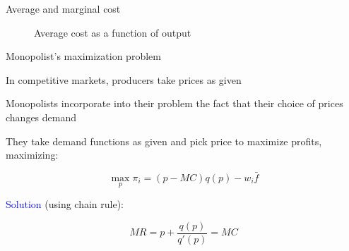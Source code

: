\documentclass[notes,11pt, aspectratio=169, xcolor=table]{beamer}
\newcommand{\blue}[1]{\textcolor{blue}{#1}}
\newenvironment{wideitemize}{\itemize\addtolength{\itemsep}{10pt}}{\enditemize}
\begin{document}
\begin{frame}{Average and marginal cost}

    \begin{figure}[htp]
        \centering
            \caption{Average cost as a function of output}
        \label{fig: ac}
    \end{figure}    
\end{frame}



\begin{frame}{Monopolist's maximization problem}

\begin{wideitemize}
    \item In competitive markets, producers take prices as given 
    \item Monopolists incorporate into their problem the fact that their choice of prices changes demand
    \item They take demand functions as given and pick price to maximize profits, maximizing:

    \begin{equation*}
        \max_{p} \pi_i = (p-MC)q(p) - w_i \bar{f}
    \end{equation*}

    \blue{Solution} (using chain rule):

    \begin{equation*}
        MR = p + \frac{q(p)}{q'(p)} = MC
    \end{equation*}

\end{wideitemize}
    
\end{frame}
\end{document}
